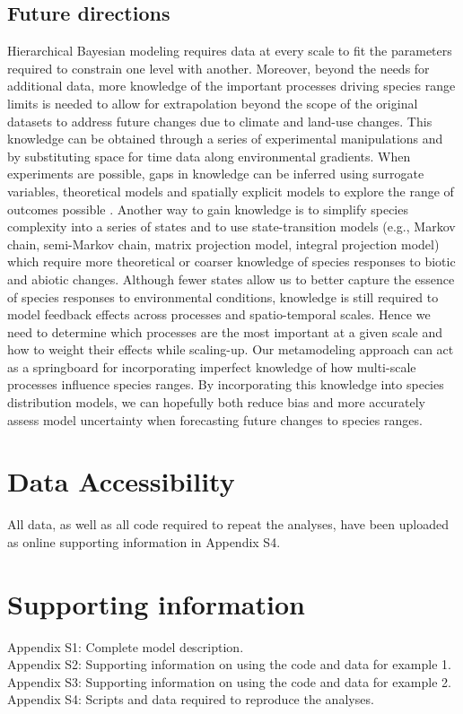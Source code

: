 \documentclass[11pt]{article}
\begin{document}
\subsection*{Future directions}
Hierarchical Bayesian modeling requires data at every scale to fit the parameters required to constrain one level with another.
Moreover, beyond the needs for additional data, more knowledge of the important processes driving species range limits is needed to allow for extrapolation beyond the scope of the original datasets to address future changes due to climate and land-use changes.
This knowledge can be obtained through a series of experimental manipulations and by substituting space for time data along environmental gradients.
When experiments are possible, gaps in knowledge can be inferred using surrogate variables, theoretical models and spatially explicit models to explore the range of outcomes possible \citep{Fortin2012}. 
Another way to gain knowledge is to simplify species complexity into a series of states and to use state-transition models (e.g., Markov chain, semi-Markov chain, matrix projection model, integral projection model) which require more theoretical or coarser knowledge of species responses to biotic and abiotic changes.
Although fewer states allow us to better capture the essence of species responses to environmental conditions, knowledge is still required to model feedback effects across processes and spatio-temporal scales.
Hence we need to determine which processes are the most important at a given scale and how to weight their effects while scaling-up.
Our metamodeling approach can act as a springboard for incorporating imperfect knowledge of how multi-scale processes influence species ranges.
By incorporating this knowledge into species distribution models, we can hopefully both reduce bias and more accurately assess model uncertainty when forecasting future changes to species ranges.

\section*{Data Accessibility}
All data, as well as all code required to repeat the analyses, have been uploaded as online supporting information in Appendix S4.


%
%
\section*{Supporting information}
Appendix S1: Complete model description. \\
Appendix S2: Supporting information on using the code and data for example 1. \\
Appendix S3: Supporting information on using the code and data for example 2. \\
Appendix S4: Scripts and data required to reproduce the analyses.
\end{document}
